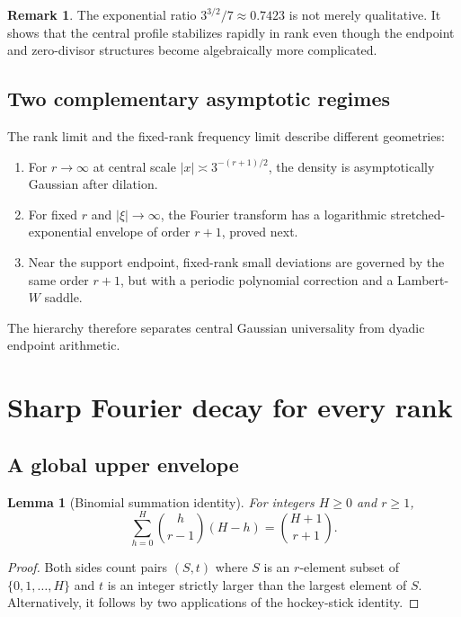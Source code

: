 \documentclass[11pt,a4paper]{article}
\theoremstyle{frontier}
\newtheorem{lemma}[theorem]{Lemma}
\theoremstyle{definition}
\newtheorem{remark}[theorem]{Remark}
\begin{document}
\begin{remark}
The exponential ratio $3^{3/2}/7\approx0.7423$ is not merely qualitative.  It shows that the central profile stabilizes rapidly in rank even though the endpoint and zero-divisor structures become algebraically more complicated.
\end{remark}

\subsection{Two complementary asymptotic regimes}

The rank limit and the fixed-rank frequency limit describe different geometries:
\begin{enumerate}[label=(\alph*)]
\item For $r\to\infty$ at central scale $|x|\asymp3^{-(r+1)/2}$, the density is asymptotically Gaussian after dilation.
\item For fixed $r$ and $|\xi|\to\infty$, the Fourier transform has a logarithmic stretched-exponential envelope of order $r+1$, proved next.
\item Near the support endpoint, fixed-rank small deviations are governed by the same order $r+1$, but with a periodic polynomial correction and a Lambert-$W$ saddle.
\end{enumerate}
The hierarchy therefore separates central Gaussian universality from dyadic endpoint arithmetic.

\section{Sharp Fourier decay for every rank}\label{sec:fourier}

\subsection{A global upper envelope}

\begin{lemma}[Binomial summation identity]\label{lem:binomial-distance}
For integers $H\ge0$ and $r\ge1$,
\begin{equation}\label{eq:binomial-distance}
 \sum_{h=0}^{H}\binom h{r-1}(H-h)=\binom{H+1}{r+1}.
\end{equation}
\end{lemma}

\begin{proof}
Both sides count pairs $(S,t)$ where $S$ is an $r$-element subset of
$\{0,1,\ldots,H\}$ and $t$ is an integer strictly larger than the largest element of $S$.  Alternatively, it follows by two applications of the hockey-stick identity.
\end{proof}
\end{document}
